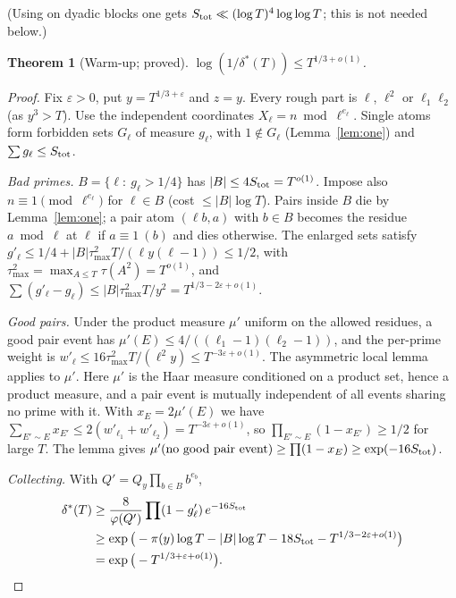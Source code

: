 \documentclass[11pt,reqno]{amsart}
\newtheorem{theorem}{Theorem}[section]
\theoremstyle{definition}
\begin{document}
(Using \cite[Prop.~1.4]{ET} on dyadic blocks one gets
$S_{\rm tot}\ll(\log T)^4\log\log T$; this is not needed below.)

\begin{theorem}[Warm-up; proved]\label{thm:haar-intro}
$\log(1/\delta^*(T))\le T^{1/3+o(1)}$.
\end{theorem}

\begin{proof}
Fix $\varepsilon>0$, put $y=T^{1/3+\varepsilon}$ and $z=y$.  Every rough part is
$\ell$, $\ell^2$ or $\ell_1\ell_2$ (as $y^3>T$).  Use the independent coordinates
$X_\ell=n\bmod\ell^{e_\ell}$.  Single atoms form forbidden sets $G_\ell$ of
measure $g_\ell$, with $1\notin G_\ell$ (Lemma~\ref{lem:one}) and
$\sum g_\ell\le S_{\rm tot}$.

\emph{Bad primes.}  $B=\{\ell:\ g_\ell>1/4\}$ has $|B|\le4S_{\rm tot}=T^{o(1)}$.
Impose also $n\equiv1\pmod{\ell^{e_\ell}}$ for $\ell\in B$ (cost $\le|B|\log T$).
Pairs inside $B$ die by Lemma~\ref{lem:one}; a pair atom $(\ell b,a)$ with
$b\in B$ becomes the residue $a\bmod\ell$ at $\ell$ if $a\equiv1\ (b)$ and dies
otherwise.  The enlarged sets satisfy
$g'_\ell\le1/4+|B|\tau^2_{\max}T/(\ell y(\ell-1))\le1/2$, with
$\tau^2_{\max}=\max_{A\le T}\tau(A^2)=T^{o(1)}$, and
$\sum(g'_\ell-g_\ell)\le|B|\tau^2_{\max}T/y^2=T^{1/3-2\varepsilon+o(1)}$.

\emph{Good pairs.}  Under the product measure $\mu'$ uniform on the allowed
residues, a good pair event has $\mu'(E)\le4/((\ell_1-1)(\ell_2-1))$, and the
per-prime weight is
$w'_\ell\le16\tau^2_{\max}T/(\ell^2y)\le T^{-3\varepsilon+o(1)}$.  The asymmetric local
lemma \cite[Lemma~5.1.1]{AS} applies to $\mu'$.  Here $\mu'$ is the Haar
measure conditioned on a product set, hence a product measure, and a pair event
is mutually independent of all events sharing no prime with it.  With
$x_E=2\mu'(E)$ we have
$\sum_{E'\sim E}x_{E'}\le2(w'_{\ell_1}+w'_{\ell_2})=T^{-3\varepsilon+o(1)}$, so
$\prod_{E'\sim E}(1-x_{E'})\ge1/2$ for large $T$.  The lemma gives
$\mu'(\text{no good pair event})\ge\prod(1-x_E)\ge\exp(-16S_{\rm tot})$.

\emph{Collecting.}  With $Q'=Q_y\prod_{b\in B}b^{e_b}$,
\begin{align*}
\delta^*(T)&\ge\frac{8}{\varphi(Q')}\prod(1-g'_\ell)\,e^{-16S_{\rm tot}}\\
&\ge\exp\big(-\pi(y)\log T-|B|\log T-18S_{\rm tot}-T^{1/3-2\varepsilon+o(1)}\big)\\
&=\exp\big(-T^{1/3+\varepsilon+o(1)}\big).
\end{align*}
\end{proof}
\end{document}
